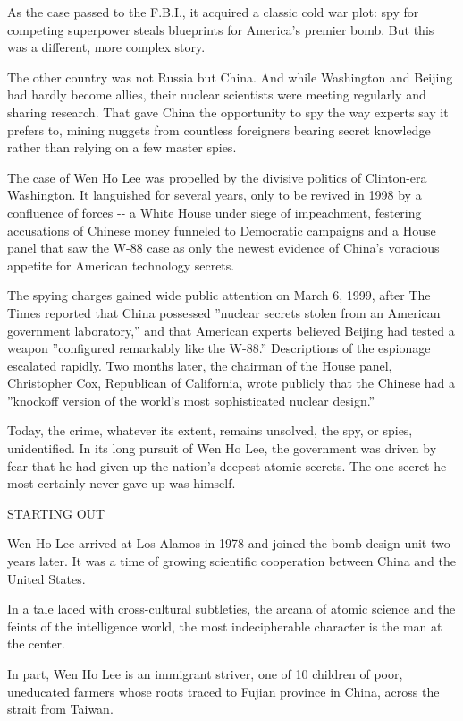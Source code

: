 As the case passed to the F.B.I., it acquired a classic cold war plot:
spy for competing superpower steals blueprints for America's premier
bomb. But this was a different, more complex story.

The other country was not Russia but China. And while Washington and
Beijing had hardly become allies, their nuclear scientists were meeting
regularly and sharing research. That gave China the opportunity to spy
the way experts say it prefers to, mining nuggets from countless
foreigners bearing secret knowledge rather than relying on a few master
spies.

The case of Wen Ho Lee was propelled by the divisive politics of
Clinton-era Washington. It languished for several years, only to be
revived in 1998 by a confluence of forces -\/- a White House under siege
of impeachment, festering accusations of Chinese money funneled to
Democratic campaigns and a House panel that saw the W-88 case as only
the newest evidence of China's voracious appetite for American
technology secrets.

The spying charges gained wide public attention on March 6, 1999, after
The Times reported that China possessed ''nuclear secrets stolen from an
American government laboratory,'' and that American experts believed
Beijing had tested a weapon ''configured remarkably like the W-88.''
Descriptions of the espionage escalated rapidly. Two months later, the
chairman of the House panel, Christopher Cox, Republican of California,
wrote publicly that the Chinese had a ''knockoff version of the world's
most sophisticated nuclear design.''

Today, the crime, whatever its extent, remains unsolved, the spy, or
spies, unidentified. In its long pursuit of Wen Ho Lee, the government
was driven by fear that he had given up the nation's deepest atomic
secrets. The one secret he most certainly never gave up was himself.

STARTING OUT

Wen Ho Lee arrived at Los Alamos in 1978 and joined the bomb-design unit
two years later. It was a time of growing scientific cooperation between
China and the United States.

In a tale laced with cross-cultural subtleties, the arcana of atomic
science and the feints of the intelligence world, the most
indecipherable character is the man at the center.

In part, Wen Ho Lee is an immigrant striver, one of 10 children of poor,
uneducated farmers whose roots traced to Fujian province in China,
across the strait from Taiwan.

